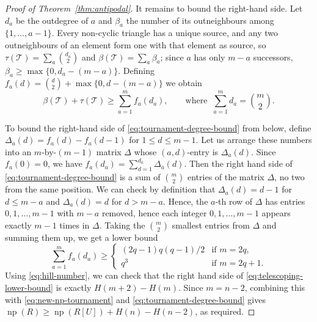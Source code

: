 \documentclass[10pt,a4paper]{amsart}
\newcommand{\np}{\operatorname{np}}
\begin{document}
\begin{proof}[Proof of Theorem~\ref{thm:antipodal}]
It remains to bound the right-hand side.  Let \(d_a\) be the
outdegree of \(a\) and \(\beta_a\) the number of its outneighbours among
\(\{1,\ldots,a-1\}\).  Every non-cyclic triangle has a unique source, and
any two outneighbours of an element form one with that element as
source, so \(\tau(\mathcal T)=\sum_a\binom{d_a}2\) and
\(\beta(\mathcal T)=\sum_a \beta_a\); since \(a\) has only \(m-a\)
successors, \(\beta_a\geq\max\{0,d_a-(m-a)\}\).  Defining
\(f_a(d)=\binom d2+\max\{0,d-(m-a)\}\) we obtain
\begin{equation}\label{eq:tournament-degree-bound}
\beta(\mathcal T)+\tau(\mathcal T)\geq\sum_{a=1}^m f_a(d_a),
\qquad\text{where }\ \sum_{a=1}^m d_a=\binom m2 .
\end{equation}

To bound the right-hand side of
\eqref{eq:tournament-degree-bound} from below, define
\(\Delta_a(d)=f_a(d)-f_a(d-1)\) for \(1\leq d\leq m-1\).
Let us arrange these numbers into an \(m\)-by-\((m-1)\) matrix \(\Delta\) whose \((a,d)\)-entry is \(\Delta_a(d)\).
Since \(f_a(0)=0\), we have \(f_a(d_a)=\sum_{d=1}^{d_a}\Delta_a(d)\). Then the right hand side of \eqref{eq:tournament-degree-bound} is a sum of \(\binom{m}{2}\) entries of the matrix \(\Delta\), no two from the same position. We can check by definition that \(\Delta_a(d) = d-1\) for \(d \leq m-a\) and \(\Delta_a(d) = d\) for \(d > m-a\). Hence, the \(a\)-th row of \(\Delta\) has entries \(0,1,\ldots,m-1\) with \(m-a\) removed, hence each integer \(0,1,\ldots,m-1\) appears exactly \(m-1\) times in \(\Delta\). Taking the \(\binom{m}{2}\) smallest entries from \(\Delta\) and summing them up, we get a lower bound \begin{equation}\label{eq:telescoping-lower-bound}
    \sum_{a=1}^m f_a(d_a) \geq \begin{cases}
       (2q-1)q(q-1)/2 & \text{if \(m=2q\),}\\
       q^3 & \text{if \(m=2q+1\).}
    \end{cases}
\end{equation} Using \eqref{eq:hill-number}, we can check that the right hand side of \eqref{eq:telescoping-lower-bound} is exactly \(H(m+2) - H(m)\). Since \(m = n-2\), combining this with \eqref{eq:new-np-tournament} and \eqref{eq:tournament-degree-bound} gives \(\np(R) \geq \np(R[U]) + H(n) - H(n-2)\), as required.
\end{proof}
\end{document}
